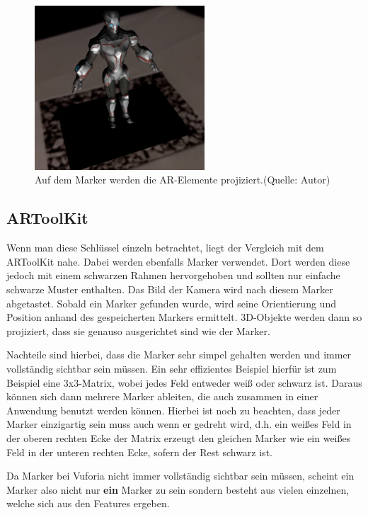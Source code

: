 \begin{figure}[h]
	\centering
	\includegraphics[width=2.5in]{pictures/vuforia_sample2}
	\caption{Auf dem Marker werden die AR-Elemente projiziert.\newline (Quelle: Autor)}
	\label{vuforia_sample}
\end{figure}

\subsection{ARToolKit}
Wenn man diese Schlüssel einzeln betrachtet, liegt der Vergleich mit dem ARToolKit \cite{artoolkit1}\cite{artoolkit2} nahe. Dabei werden ebenfalls Marker verwendet. Dort werden diese jedoch mit einem schwarzen Rahmen hervorgehoben und sollten nur einfache schwarze Muster enthalten. Das Bild der Kamera wird nach diesem Marker abgetastet. Sobald ein Marker gefunden wurde, wird seine Orientierung und Position anhand des gespeicherten Markers ermittelt. 3D-Objekte werden dann so projiziert, dass sie genauso ausgerichtet sind wie der Marker.\par
Nachteile sind hierbei, dass die Marker sehr simpel gehalten werden und immer vollständig sichtbar sein müssen. Ein sehr effizientes Beispiel hierfür ist zum Beispiel eine 3x3-Matrix, wobei jedes Feld entweder weiß oder schwarz ist. Daraus können sich dann mehrere Marker ableiten, die auch zusammen in einer Anwendung benutzt werden können. Hierbei ist noch zu beachten, dass jeder Marker einzigartig sein muss auch wenn er gedreht wird, d.h. ein weißes Feld in der oberen rechten Ecke der Matrix erzeugt den gleichen Marker wie ein weißes Feld in der unteren rechten Ecke, sofern der Rest schwarz ist.\par
Da Marker bei Vuforia nicht immer vollständig sichtbar sein müssen, scheint ein Marker also nicht nur \textbf{ein} Marker zu sein sondern besteht aus vielen einzelnen, welche sich aus den Features ergeben.

